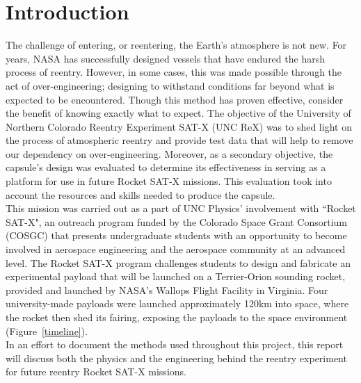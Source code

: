 \documentclass{article}
\begin{document}
\section{Introduction}
	\begin{doublespace}
		\indent\indent The challenge of entering, or reentering, the Earth's atmosphere is not new. For years, NASA has successfully designed vessels that have endured the harsh process of reentry. However, in some cases, this was made possible through the act of over-engineering; designing to withstand conditions far beyond what is expected to be encountered. Though this method has proven effective, consider the benefit of knowing exactly what to expect. The objective of the University of Northern Colorado Reentry Experiment SAT-X (UNC ReX) was to shed light on the process of atmospheric reentry and provide test data that will help to remove our dependency on over-engineering. Moreover, as a secondary objective, the capsule's design was evaluated to determine its effectiveness in serving as a platform for use in future Rocket SAT-X missions. This evaluation took into account the resources and skills needed to produce the capsule.\\
		\indent This mission was carried out as a part of UNC Physics' involvement with ``Rocket SAT-X", an outreach program funded by the Colorado Space Grant Consortium (COSGC) that presents undergraduate students with an opportunity to become involved in aerospace engineering and the aerospace community at an advanced level. The Rocket SAT-X program challenges students to design and fabricate an experimental payload that will be launched on a Terrier-Orion sounding rocket, provided and launched by NASA's Wallops Flight Facility in Virginia. Four university-made payloads were launched approximately 120km into space, where the rocket then shed its fairing, exposing the payloads to the space environment (Figure~\ref{timeline}). \\
		\indent In an effort to document the methods used throughout this project, this report will discuss both the physics and the engineering behind the reentry experiment for future reentry Rocket SAT-X missions.

\end{doublespace}
\end{document}
